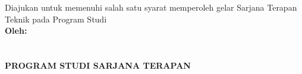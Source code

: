 \begin{titlepage}
	\begin{center}
		
		\begin{doublespace}
			\textbf{\MakeUppercase{\large{\tipe}}}\\[0.5cm]\textbf{\MakeUppercase{\normalsize{\judulid}}}\\[3cm]
			
		\end{doublespace}
		Diajukan untuk memenuhi salah satu syarat memperoleh gelar Sarjana Terapan Teknik pada Program Studi {\prodi} {\departemen} {\fakultas} {\universitas}\\[3cm]
		
		
		\textbf{\normalsize {Oleh:}} \\
		\textbf{\normalsize \MakeUppercase{\underline{\penulis}}} \\
		\textbf{\normalsize \MakeUppercase{{\nim}}} \\[7cm]
		
		
		\textbf{\normalsize \MakeUppercase{Program Studi Sarjana Terapan\\ \prodi}}\\
		\textbf{\normalsize \MakeUppercase{\departemen}}\\
		\textbf{\normalsize \MakeUppercase{\fakultas}}\\
		\textbf{\normalsize \MakeUppercase{\universitas}}\\
		\textbf{\normalsize \the\year{}}\\
	\end{center}
\end{titlepage}